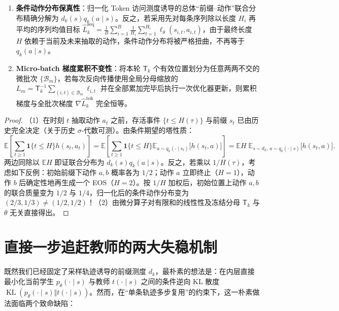 \documentclass[lang=cn,scheme=chinese,openany]{../book/elegantbook}
\newcommand{\E}{\mathbb E}
\newcommand{\KL}{\operatorname{KL}}
\begin{document}
\begin{proposition}[访问测度分解定理与序列长度归一化的分布扭曲反例]
\label{prop:prefix-measure-decomp}
\label{prop:micro-batch-invariance}
\begin{enumerate}
\item \textbf{条件动作分布保真性}：归一化 Token 访问测度诱导的总体“前缀--动作”联合分布精确分解为 $d_k(s) q_k(a\mid s)$。反之，若采用先对每条序列除以长度 $H_i$ 再平均的序列均值目标 $\widehat L_k^{\mathrm{seq}}=\frac1B\sum_{i=1}^B\frac1{H_i}\sum_{t=1}^{H_i}\ell_\theta(s_{i,t},a_{i,t})$，由于最终长度 $H$ 依赖于当前及未来抽取的动作，条件动作分布将被严格扭曲，不再等于 $q_k(a\mid s)$。
\item \textbf{Micro-batch 梯度累积不变性}：将本轮 $\mathsf T_k$ 个有效位置划分为任意两两不交的微批次 $\{\mathcal B_m\}$，若每次反向传播使用全局分母缩放的 $L_m=\mathsf T_k^{-1}\sum_{(i,t)\in\mathcal B_m}\ell_{i,t}$ 并在全部累加完毕后执行一次优化器更新，则累积梯度与全批次梯度 $\nabla\widehat L_k^{\mathrm{tok}}$ 完全恒等。
\end{enumerate}
\end{proposition}
\begin{proof}
（1）在时刻 $t$ 抽取动作 $a_t$ 之前，存活事件 $\{t\le H(\tau)\}$ 与前缀 $s_t$ 已由历史完全决定（关于历史 $\sigma$-代数可测）。由条件期望的塔性质：
\begin{equation}
 \mathbb E\left[\sum_{t\ge1}\mathbf1\{t\le H\}h(s_t,a_t)\right]
 =\mathbb E\left[\sum_{t\ge1}\mathbf1\{t\le H\}
 \mathbb E_{a\sim q_k(\cdot\mid s_t)}\bigl[h(s_t,a)\bigr]\right]
 =\mathbb E H\;\mathbb E_{s\sim d_k,\,a\sim q_k(\cdot\mid s)}\bigl[h(s_t,a)\bigr].
\end{equation}
两边同除以 $\E H$ 即证联合分布为 $d_k(s)q_k(a\mid s)$。反之，若乘以 $1/H(\tau)$，考虑如下反例：初始前缀下动作 $a,b$ 概率各为 $1/2$；动作 $a$ 立即终止（$H=1$），动作 $b$ 后确定性地再生成一个 EOS（$H=2$）。按 $1/H$ 加权后，初始位置上动作 $a,b$ 的联合质量变为 $1/2$ 与 $1/4$，归一化后的条件动作分布变为 $(2/3,1/3)\ne(1/2,1/2)$！（2）由微分算子对有限和的线性性及冻结分母 $\mathsf T_k$ 与 $\theta$ 无关直接得出。
\end{proof}

\section{直接一步追赶教师的两大失稳机制}

既然我们已经固定了采样轨迹诱导的前缀测度 $d_k$，最朴素的想法是：在内层直接最小化当前学生 $p_\theta(\cdot\mid s)$ 与教师 $t(\cdot\mid s)$ 之间的条件逆向 KL 散度 $\KL(p_\theta(\cdot\mid s)\Vert t(\cdot\mid s))$。然而，在“单条轨迹多步复用”的约束下，这一朴素做法面临两个致命缺陷：
\end{document}

